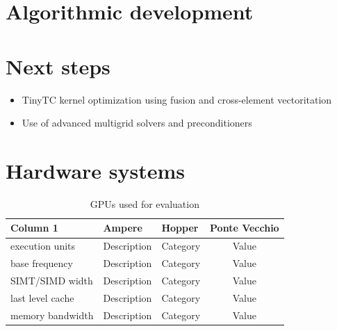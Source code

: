 \documentclass[a4paper,12pt]{article}
\begin{document}
\section{Algorithmic development}


\section{Next steps}

\begin{itemize}
    \item TinyTC kernel optimization using fusion and cross-element vectoritation
    \item Use of advanced multigrid solvers and preconditioners
\end{itemize}


\section{Hardware systems}

\begin{center}
    \begin{table}[h!]
    \small
    \caption{GPUs used for evaluation}
    \renewcommand{\arraystretch}{1.25}
    \label{tab:example_table}
    \begin{tabular}{|l|l|l|c|}
    \hline
    \textbf{Column 1} & \textbf{Ampere} & \textbf{Hopper} & \textbf{Ponte Vecchio} \\
    \hline
    execution units & Description & Category & Value \\
    base frequency & Description & Category & Value \\
    SIMT/SIMD width & Description & Category & Value \\
    last level cache & Description & Category & Value \\
    memory bandwidth & Description & Category & Value \\
    \hline
    \end{tabular}
    \end{table}
\end{center}



\label{MyLastPage}
\end{document}
